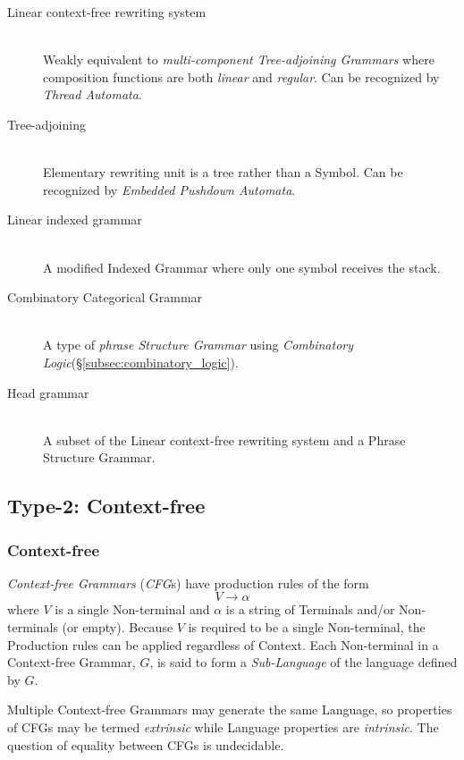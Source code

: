 \documentclass{article}
\begin{document}
\begin{description}
\item[Linear context-free rewriting system] \hfill \\
    Weakly equivalent to \emph{multi-component Tree-adjoining
      Grammars} where composition functions are both \emph{linear} and
    \emph{regular}. Can be recognized by \emph{Thread
      Automata}\cite{villemonte02}.

\item[Tree-adjoining] \hfill \\
    Elementary rewriting unit is a tree rather than a Symbol. Can be
    recognized by \emph{Embedded Pushdown
      Automata}\cite{vijayashanker88}.

\item[Linear indexed grammar] \hfill \\
    A modified Indexed Grammar where only one symbol receives the
    stack.

\item[Combinatory Categorical Grammar] \hfill \\
    A type of \emph{phrase Structure Grammar} using \emph{Combinatory
      Logic}(\S\ref{subsec:combinatory_logic}).

\item[Head grammar] \hfill \\
    A subset of the Linear context-free rewriting system and a Phrase
    Structure Grammar.

\end{description}

\subsection{Type-2: Context-free}\label{subsec:context_free_language}

\subsubsection{Context-free}
\emph{Context-free Grammars} (\emph{CFG}s) have production rules of the form
\[
    V \rightarrow \alpha
\]
where $V$ is a single Non-terminal and $\alpha$ is a string of Terminals
and/or Non-terminals (or empty). Because $V$ is required to be a
single Non-terminal, the Production rules can be applied regardless of
Context. Each Non-terminal in a Context-free Grammar, $G$, is said to
form a \emph{Sub-Language} of the language defined by $G$.

Multiple Context-free Grammars may generate the same Language, so
properties of CFGs may be termed \emph{extrinsic} while Language properties
are \emph{intrinsic}. The question of equality between CFGs is
undecidable.
\end{document}
